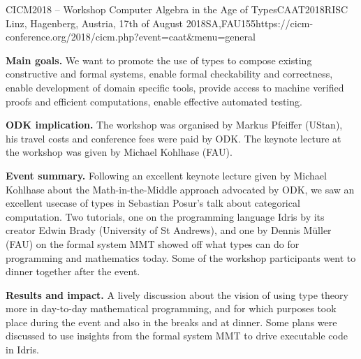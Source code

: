 \begin{event}{CICM2018 -- Workshop Computer Algebra in the Age of Types}{CAAT2018}{RISC Linz, Hagenberg, Austria, 17th of August 2018}{SA,FAU}{15}{5}{https://cicm-conference.org/2018/cicm.php?event=caat&menu=general}

\textbf{Main goals.} We want to promote the use of types to compose existing
constructive and formal systems, enable formal checkability and correctness,
enable development of domain specific tools, provide access to machine verified
proofs and efficient computations, enable effective automated testing.

\textbf{ODK implication.} The workshop was organised by Markus Pfeiffer (UStan), his
travel costs and conference fees were paid by ODK. The keynote lecture at the
workshop was given by Michael Kohlhase (FAU).

\textbf{Event summary.} Following an excellent keynote lecture given by Michael
Kohlhase about the Math-in-the-Middle approach advocated by ODK, we saw an
excellent usecase of types in Sebastian Posur's talk about categorical
computation. Two tutorials, one on the programming language Idris by its creator
Edwin Brady (University of St Andrews), and one by Dennis Müller (FAU) on the
formal system MMT showed off what types can do for programming and mathematics
today.
Some of the workshop participants went to dinner together after the event.

\textbf{Results and impact.} A lively discussion about the vision of using type
theory more in day-to-day mathematical programming, and for which purposes took
place during the event and also in the breaks and at dinner.
Some plans were discussed to use insights from the formal system MMT to drive
executable code in Idris.

\end{event}
